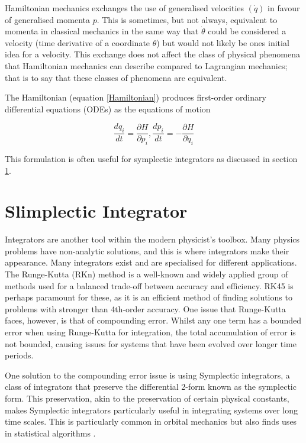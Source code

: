 \documentclass[10pt]{iopart}
\begin{document}
Hamiltonian mechanics exchanges the use of generalised velocities $(\dot q)$ in favour of generalised momenta $p$. This is sometimes, but not always, equivalent to momenta in classical mechanics in the same way that $\dot\theta$ could be considered a velocity (time derivative of a coordinate $\theta$) but would not likely be ones initial idea for a velocity. This exchange does not affect the class of physical phenomena that Hamiltonian mechanics can describe compared to Lagrangian mechanics; that is to say that these classes of phenomena are equivalent.

The Hamiltonian (equation \ref{Hamiltonian}) produces first-order ordinary differential equations (ODEs) as the equations of motion

\begin{equation}
	\frac{dq_i}{dt} = \frac{\partial H}{\partial p_i}, \frac{dp_i}{dt} = -\frac{\partial H}{\partial q_i}
\end{equation}

This formulation is often useful for symplectic integrators \cite{SanzSerna} as discussed in section \ref{Symplectic}.

\section{Slimplectic Integrator}
\label{Symplectic}
Integrators are another tool within the modern physicist's toolbox. Many physics problems have non-analytic solutions, and this is where integrators make their appearance. Many integrators exist and are specialised for different applications. The Runge-Kutta (RKn) method \cite{RungeKutta} is a well-known and widely applied group of methods used for a balanced trade-off between accuracy and efficiency. RK45 is perhaps paramount for these, as it is an efficient method of finding solutions to problems with stronger than 4th-order accuracy. One issue that Runge-Kutta faces, however, is that of compounding error. Whilst any one term has a bounded error when using Runge-Kutta for integration, the total accumulation of error is not bounded, causing issues for systems that have been evolved over longer time periods. 

One solution to the compounding error issue is using Symplectic integrators, a class of integrators that preserve the differential 2-form known as the symplectic form. This preservation, akin to the preservation of certain physical constants, makes Symplectic integrators particularly useful in integrating systems over long time scales. This is particularly common in orbital mechanics \cite{WISDOM, ReinTamayo} but also finds uses in statistical algorithms \cite{Neal_MCMC}.
\end{document}
